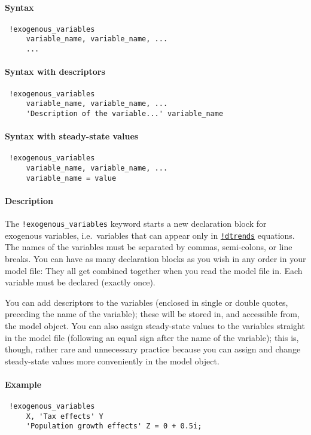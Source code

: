


	\paragraph{Syntax}
 
 \begin{verbatim}
 !exogenous_variables
     variable_name, variable_name, ...
     ...
 \end{verbatim}
 
 \paragraph{Syntax with descriptors}
 
 \begin{verbatim}
 !exogenous_variables
     variable_name, variable_name, ...
     'Description of the variable...' variable_name
 \end{verbatim}
 
 \paragraph{Syntax with steady-state values}
 
 \begin{verbatim}
 !exogenous_variables
     variable_name, variable_name, ...
     variable_name = value
 \end{verbatim}
 
 \paragraph{Description}
 
 The \texttt{!exogenous\_variables} keyword starts a new declaration
 block for exogenous variables, i.e.~variables that can appear only in
 \href{modellang/dtrends}{\texttt{!dtrends}} equations. The names of the
 variables must be separated by commas, semi-colons, or line breaks. You
 can have as many declaration blocks as you wish in any order in your
 model file: They all get combined together when you read the model file
 in. Each variable must be declared (exactly once).
 
 You can add descriptors to the variables (enclosed in single or double
 quotes, preceding the name of the variable); these will be stored in,
 and accessible from, the model object. You can also assign steady-state
 values to the variables straight in the model file (following an equal
 sign after the name of the variable); this is, though, rather rare and
 unnecessary practice because you can assign and change steady-state
 values more conveniently in the model object.
 
 \paragraph{Example}
 
 \begin{verbatim}
 !exogenous_variables
     X, 'Tax effects' Y
     'Population growth effects' Z = 0 + 0.5i;
 \end{verbatim}



